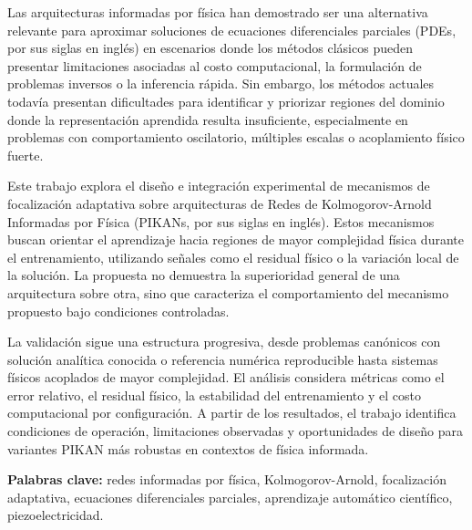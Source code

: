 Las arquitecturas informadas por física han demostrado ser una alternativa relevante para aproximar soluciones de ecuaciones diferenciales parciales (PDEs, por sus siglas en inglés) en escenarios donde los métodos clásicos pueden presentar limitaciones asociadas al costo computacional, la formulación de problemas inversos o la inferencia rápida. Sin embargo, los métodos actuales todavía presentan dificultades para identificar y priorizar regiones del dominio donde la representación aprendida resulta insuficiente, especialmente en problemas con comportamiento oscilatorio, múltiples escalas o acoplamiento físico fuerte.

Este trabajo explora el diseño e integración experimental de mecanismos de focalización adaptativa sobre arquitecturas de Redes de Kolmogorov-Arnold Informadas por Física (PIKANs, por sus siglas en inglés). Estos mecanismos buscan orientar el aprendizaje hacia regiones de mayor complejidad física durante el entrenamiento, utilizando señales como el residual físico o la variación local de la solución. La propuesta no demuestra la superioridad general de una arquitectura sobre otra, sino que caracteriza el comportamiento del mecanismo propuesto bajo condiciones controladas.

La validación sigue una estructura progresiva, desde problemas canónicos con solución analítica conocida o referencia numérica reproducible hasta sistemas físicos acoplados de mayor complejidad. El análisis considera métricas como el error relativo, el residual físico, la estabilidad del entrenamiento y el costo computacional por configuración. A partir de los resultados, el trabajo identifica condiciones de operación, limitaciones observadas y oportunidades de diseño para variantes PIKAN más robustas en contextos de física informada.

\vspace{0.8em}
\noindent\textbf{Palabras clave:} redes informadas por física, Kolmogorov-Arnold, focalización adaptativa, ecuaciones diferenciales parciales, aprendizaje automático científico, piezoelectricidad.